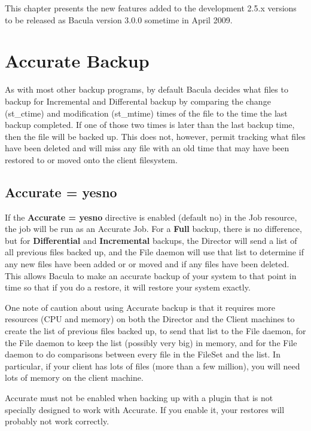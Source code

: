 This chapter presents the new features added to the development 2.5.x
versions to be released as Bacula version 3.0.0 sometime in April 2009.

\section{Accurate Backup}

As with most other backup programs, by default Bacula decides what files to
backup for Incremental and Differental backup by comparing the change
(st\_ctime) and modification (st\_mtime) times of the file to the time the last
backup completed.  If one of those two times is later than the last backup
time, then the file will be backed up.  This does not, however, permit tracking
what files have been deleted and will miss any file with an old time that may
have been restored to or moved onto the client filesystem.

\subsection{Accurate = \lt{}yes\vb{}no\gt{}}
If the {\bf Accurate = \lt{}yes\vb{}no\gt{}} directive is enabled (default no) in
the Job resource, the job will be run as an Accurate Job. For a {\bf Full}
backup, there is no difference, but for {\bf Differential} and {\bf
  Incremental} backups, the Director will send a list of all previous files
backed up, and the File daemon will use that list to determine if any new files
have been added or or moved and if any files have been deleted. This allows
Bacula to make an accurate backup of your system to that point in time so that
if you do a restore, it will restore your system exactly.  

One note of caution
about using Accurate backup is that it requires more resources (CPU and memory)
on both the Director and the Client machines to create the list of previous
files backed up, to send that list to the File daemon, for the File daemon to
keep the list (possibly very big) in memory, and for the File daemon to do
comparisons between every file in the FileSet and the list.  In particular,
if your client has lots of files (more than a few million), you will need
lots of memory on the client machine.

Accurate must not be enabled when backing up with a plugin that is not
specially designed to work with Accurate. If you enable it, your restores
will probably not work correctly.

